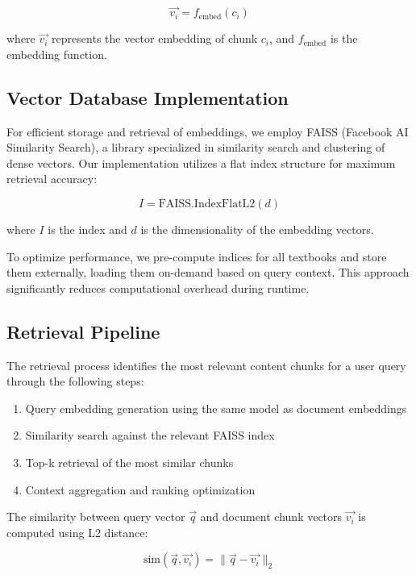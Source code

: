 \documentclass[10pt,conference]{IEEEtran}
\begin{document}
\begin{equation}
\vec{v_i} = f_{\text{embed}}(c_i)
\end{equation}

where $\vec{v_i}$ represents the vector embedding of chunk $c_i$, and $f_{\text{embed}}$ is the embedding function.

\subsection{Vector Database Implementation}
For efficient storage and retrieval of embeddings, we employ FAISS (Facebook AI Similarity Search), a library specialized in similarity search and clustering of dense vectors. Our implementation utilizes a flat index structure for maximum retrieval accuracy:

\begin{equation}
I = \text{FAISS.IndexFlatL2}(d)
\end{equation}

where $I$ is the index and $d$ is the dimensionality of the embedding vectors.

To optimize performance, we pre-compute indices for all textbooks and store them externally, loading them on-demand based on query context. This approach significantly reduces computational overhead during runtime.

\subsection{Retrieval Pipeline}
The retrieval process identifies the most relevant content chunks for a user query through the following steps:

\begin{enumerate}
    \item Query embedding generation using the same model as document embeddings
    \item Similarity search against the relevant FAISS index
    \item Top-k retrieval of the most similar chunks
    \item Context aggregation and ranking optimization
\end{enumerate}

The similarity between query vector $\vec{q}$ and document chunk vectors $\vec{v_i}$ is computed using L2 distance:

\begin{equation}
\text{sim}(\vec{q}, \vec{v_i}) = \lVert \vec{q} - \vec{v_i} \rVert_2
\end{equation}
\end{document}
